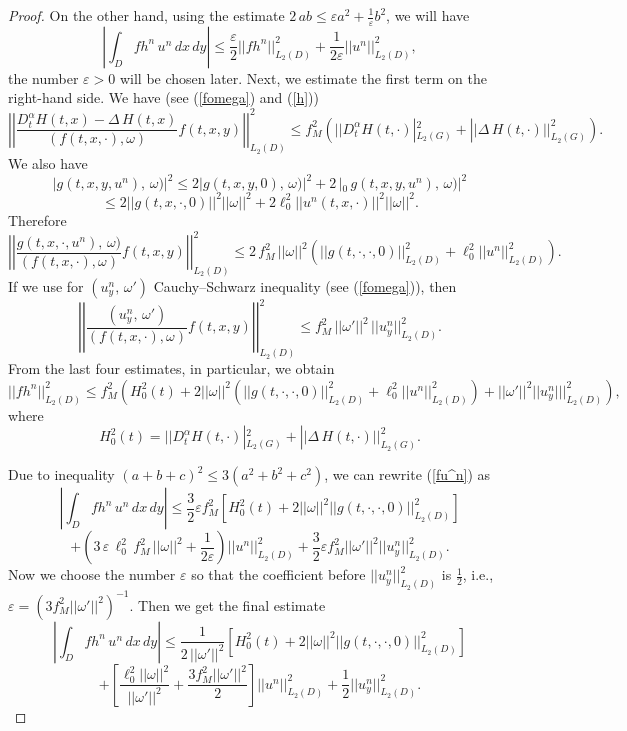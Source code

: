\documentclass[12pt]{amsart}
\theoremstyle{definition}
\numberwithin{equation}{section}
\begin{document}
\begin{proof}
On the other hand, using the estimate $2\, ab \leq \varepsilon a^2 + \frac{1}{\varepsilon} b^2$, we will have  
\begin{equation}\label{fu^n}
    \left|\int_D f h^n\, u^n\, dx\, dy\right |\leq \frac{\varepsilon}{2} ||f h^n||_{L_2(D)}^2 + \frac{1}{2\varepsilon} ||u^n||_{L_2(D)}^2,
\end{equation}
the number $\varepsilon>0$ will be chosen later.
Next, we estimate the first term on the right-hand side. We have (see (\ref{fomega}) and (\ref{h}))
\[
\left|\left|\frac{D_t^{\alpha} H(t, x) - \Delta\, H(t, x)}{(f(t, x, \cdot), \omega)} f(t,x, y) \right|\right|_{L_2(D)}^2\leq f_M^2 \left(||D_t^{\alpha} H(t, \cdot)|_{L_2(G)}^2 + ||\Delta\, H(t, \cdot)||_{L_2(G)}^2\right).
\]
We also have
\begin{equation}\label{gestimate}
    |g(t,x,y, u^n),\, \omega)|^2\leq 2 | g(t,x,y, 0),\, \omega)|^2 + 2\, | _0\, g(t,x,y, u^n),\, \omega)|^2 
\end{equation}
\[
\leq 2 ||g(t,x, \cdot, 0)||^2 ||\omega||^2 +2 \ell^2_0 ||u^n (t,x, \cdot)||^2 ||\omega||^2. 
\]
Therefore
\[
\left|\left|\frac{g(t,x,\cdot, u^n),\, \omega)}{(f(t, x, \cdot), \omega)} f(t,x, y) \right|\right|_{L_2(D)}^2\leq 2\, f_M^2 \, ||\omega||^2\left(||g(t,\cdot, \cdot, 0)||_{L_2(D)}^2 + \ell^2_0 ||u^n ||_{L_2(D)}^2\right).
\]
If we use for $(u_y^n, \, \omega')$ Cauchy–Schwarz inequality (see (\ref{fomega})), then
\[
\left|\left|\frac{(u_y^n, \, \omega')}{(f(t, x, \cdot), \omega)} f(t,x, y) \right|\right|_{L_2(D)}^2\leq  f_M^2 \, ||\omega'||^2\, ||u^n_y ||_{L_2(D)}^2.
\]
From the last four estimates, in particular, we obtain
\begin{equation}\label{fh^n_integral}
  ||f h^n||_{L_2(D)}^2\leq f_M^2 \left(H_0^2(t)+ 2 ||\omega||^2 (  ||g(t,\cdot, \cdot, 0)||_{L_2(D)}^2 + \ell^2_0 ||u^n ||_{L_2(D)}^2) + ||\omega'||^2 ||u_y^n|||_{L_2(D)}^2\right),
\end{equation}
where
\[
H_0^2(t) = ||D_t^{\alpha} H(t, \cdot)|_{L_2(G)}^2 + ||\Delta\, H(t, \cdot)||_{L_2(G)}^2.
\]

Due to inequality $(a+b+c)^2 \leq 3( a^2 + b^2 + c^2)$, we can rewrite (\ref{fu^n}) as
\[
  \left|\int_D f h^n\, u^n\, dx\, dy\right |\leq \frac{3}{2} \varepsilon f_M^2 \left[ H_0^2(t) +2 ||\omega||^2 ||g(t, \cdot, \cdot, 0)||^2_{L_2(D)}\right]
\]
\[
+\left(3\, \varepsilon\, \ell_0^2\, f_M^2\, ||\omega||^2 +\frac{1}{2 \varepsilon}\right) ||u^n||_{L_2(D)}^2 + \frac{3}{2} \varepsilon f_M^2 ||\omega'||^2 ||u_y^n||_{L_2(D)}^2.
\]
Now we choose the number $\varepsilon$ so that the coefficient before \(||u_y^n||_{L_2(D)}^2\) is $\frac{1}{2}$, i.e., $\varepsilon = (3 f_M^2 ||\omega'||^2)^{-1}$. Then we get the final estimate
\begin{equation}\label{fu^nNew}
    \left|\int_D f h^n\, u^n\, dx\, dy\right |\leq \frac{1}{2 \, ||\omega'||^2} \left[ H_0^2(t) +2 ||\omega||^2 ||g(t, \cdot, \cdot, 0)||^2_{L_2(D)}\right]
    \end{equation}
    \[
    + \left[\frac{\ell_0^2 ||\omega||^2}{||\omega'||^2} + \frac{3 f_M^2 ||\omega'||^2}{2}\right] ||u^n||_{L_2(D)}^2 + \frac{1}{2} ||u_y^n||_{L_2(D)}^2.
    \]


\end{proof}
\end{document}
